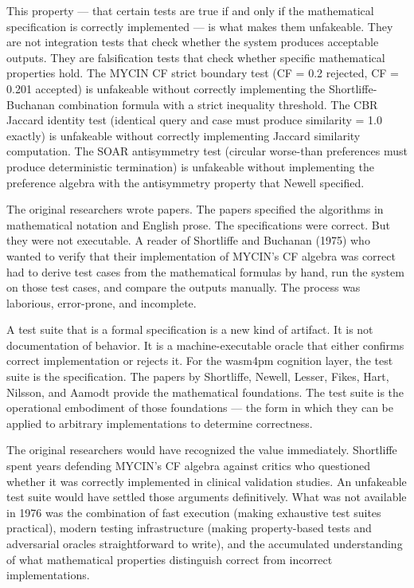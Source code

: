 This property --- that certain tests are true if and only if the mathematical specification
is correctly implemented --- is what makes them unfakeable. They are not integration tests
that check whether the system produces acceptable outputs. They are falsification tests that
check whether specific mathematical properties hold. The MYCIN CF strict boundary test
(CF = 0.2 rejected, CF = 0.201 accepted) is unfakeable without correctly implementing
the Shortliffe-Buchanan combination formula with a strict inequality threshold. The CBR
Jaccard identity test (identical query and case must produce similarity = 1.0 exactly) is
unfakeable without correctly implementing Jaccard similarity computation. The SOAR
antisymmetry test (circular worse-than preferences must produce deterministic termination)
is unfakeable without implementing the preference algebra with the antisymmetry property
that Newell specified.

The original researchers wrote papers. The papers specified the algorithms in mathematical
notation and English prose. The specifications were correct. But they were not executable.
A reader of Shortliffe and Buchanan (1975) who wanted to verify that their implementation
of MYCIN's CF algebra was correct had to derive test cases from the mathematical formulas
by hand, run the system on those test cases, and compare the outputs manually. The process
was laborious, error-prone, and incomplete.

A test suite that is a formal specification is a new kind of artifact. It is not documentation
of behavior. It is a machine-executable oracle that either confirms correct implementation
or rejects it. For the wasm4pm cognition layer, the test suite is the specification. The
papers by Shortliffe, Newell, Lesser, Fikes, Hart, Nilsson, and Aamodt provide the
mathematical foundations. The test suite is the operational embodiment of those foundations ---
the form in which they can be applied to arbitrary implementations to determine correctness.

The original researchers would have recognized the value immediately. Shortliffe spent years
defending MYCIN's CF algebra against critics who questioned whether it was correctly
implemented in clinical validation studies. An unfakeable test suite would have settled those
arguments definitively. What was not available in 1976 was the combination of fast execution
(making exhaustive test suites practical), modern testing infrastructure (making property-based
tests and adversarial oracles straightforward to write), and the accumulated understanding of
what mathematical properties distinguish correct from incorrect implementations.

